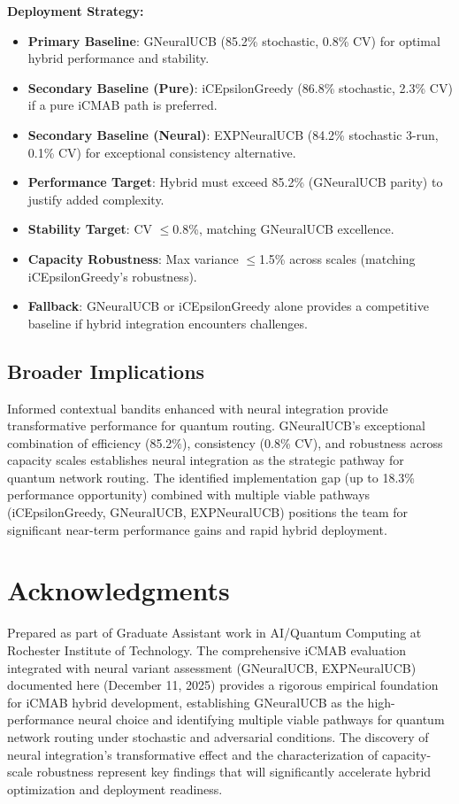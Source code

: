 \documentclass[12pt,a4paper]{article}
\begin{document}
\textbf{Deployment Strategy:}
\begin{itemize}
\item \textbf{Primary Baseline}: GNeuralUCB (85.2\% stochastic, 0.8\% CV) for optimal hybrid performance and stability.
\item \textbf{Secondary Baseline (Pure)}: iCEpsilonGreedy (86.8\% stochastic, 2.3\% CV) if a pure iCMAB path is preferred.
\item \textbf{Secondary Baseline (Neural)}: EXPNeuralUCB (84.2\% stochastic 3-run, 0.1\% CV) for exceptional consistency alternative.
\item \textbf{Performance Target}: Hybrid must exceed 85.2\% (GNeuralUCB parity) to justify added complexity.
\item \textbf{Stability Target}: CV $\leq$0.8\%, matching GNeuralUCB excellence.
\item \textbf{Capacity Robustness}: Max variance $\leq$1.5\% across scales (matching iCEpsilonGreedy's robustness).
\item \textbf{Fallback}: GNeuralUCB or iCEpsilonGreedy alone provides a competitive baseline if hybrid integration encounters challenges.
\end{itemize}

\subsection{Broader Implications}

Informed contextual bandits enhanced with neural integration provide transformative performance for quantum routing. GNeuralUCB's exceptional combination of efficiency (85.2\%), consistency (0.8\% CV), and robustness across capacity scales establishes neural integration as the strategic pathway for quantum network routing. The identified implementation gap (up to 18.3\% performance opportunity) combined with multiple viable pathways (iCEpsilonGreedy, GNeuralUCB, EXPNeuralUCB) positions the team for significant near-term performance gains and rapid hybrid deployment.

\newpage
\section{Acknowledgments}

Prepared as part of Graduate Assistant work in AI/Quantum Computing at Rochester Institute of Technology. The comprehensive iCMAB evaluation integrated with neural variant assessment (GNeuralUCB, EXPNeuralUCB) documented here (December 11, 2025) provides a rigorous empirical foundation for iCMAB hybrid development, establishing GNeuralUCB as the high-performance neural choice and identifying multiple viable pathways for quantum network routing under stochastic and adversarial conditions. The discovery of neural integration's transformative effect and the characterization of capacity-scale robustness represent key findings that will significantly accelerate hybrid optimization and deployment readiness.
\end{document}
